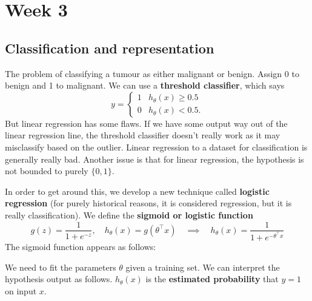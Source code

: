 \documentclass[a4paper, 12pt, oneside]{scrartcl}
\begin{document}
\section{Week 3}

\subsection{Classification and representation}

The problem of classifying a tumour as either malignant or benign. Assign 0 to benign and 1 to malignant. We can use a \textbf{threshold classifier}, which says
\[y = \begin{cases}
 1 & h_\theta(x) \geq 0.5 \\
 0 &  h_\theta(x) < 0.5.	
 \end{cases}
\]
But linear regression has some flaws. If we have some output way out of the linear regression line, the threshold classifier doesn't really work as it may misclassify based on the outlier. Linear regression to a dataset for classification is generally really bad. Another issue is that for linear regression, the hypothesis is not bounded to purely $\{0,1\}$.

In order to get around this, we develop a new technique called \textbf{logistic regression} (for purely historical reasons, it is considered regression, but it is really classification). We define the \textbf{sigmoid or logistic function}
\[g(z) = \frac{1}{1 + e^{-z}}, \quad h_\theta (x) = g(\theta^\top x) \quad \implies \quad h_\theta(x) = \frac{1}{1 + e^{-\theta^\top x}}\]
The sigmoid function appears as follows: 

\begin{figure}[H]
\centering	
{}
\end{figure}

We need to fit the parameters $\theta$ given a training set. We can interpret the hypothesis output as follows. $h_\theta(x)$ is the \textbf{estimated probability} that $y=1$ on input $x$. 
\end{document}
